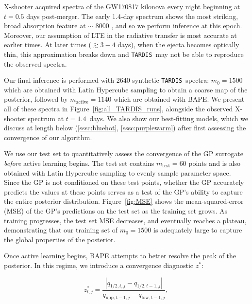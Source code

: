 \documentclass[twocolumn, twocolappendix]{aastex63}
\def\TARDIS{\texttt{TARDIS}}
\begin{document}
X-shooter acquired spectra of the GW170817 kilonova every night beginning at $t=0.5$ days post-merger. The early 1.4-day spectrum shows the most striking, broad absorption feature at $\sim$ $8000$ \text{\AA}, and so we perform inference at this epoch. Moreover, our assumption of LTE in the radiative transfer is most accurate at earlier times. At later times ($\gtrsim 3 - 4$ days), when the ejecta becomes optically thin, this approximation breaks down and \TARDIS~may not be able to reproduce the observed spectra. 


Our final inference is performed with 2640 synthetic \TARDIS~spectra: $m_0 = 1500$ which are obtained with Latin Hypercube sampling to obtain a coarse map of the posterior, followed by $m_{\mathrm{active}} = 1140$ which are obtained with BAPE. We present all of these spectra in Figure~\ref{fig:all_TARDIS_runs}, alongside the observed X-shooter spectrum at $t=1.4$~days. We also show our best-fitting models, which we discuss at length below (\ref{sssc:bluehot}, \ref{sssc:purplewarm}) after first assessing the convergence of our algorithm. 


We use our test set to quantitatively assess the convergence of the GP surrogate \textit{before} active learning begins. The test set contains $m_{\mathrm{test}} = 60$ points and is also obtained with Latin Hypercube sampling to evenly sample parameter space. Since the GP is not conditioned on these test points, whether the GP accurately predicts the values at these points serves as a test of the GP's ability to capture the entire posterior distribution. Figure~\ref{fig:MSE} shows the mean-squared-error (MSE) of the GP's predictions on the test set as the training set grows. As training progresses, the test set MSE decreases, and eventually reaches a plateau, demonstrating that our training set of $m_0 = 1500$ is adequately large to capture the global properties of the posterior. 


Once active learning begins, BAPE attempts to better resolve the peak of the posterior. In this regime, we introduce a convergence diagnostic $z^{*}$:

\begin{equation}
z^{*}_{t,j} = \frac{| q_{1/2,t,j} - q_{1/2,t-1,j} |}{ q_{\mathrm{upp},t-1,j} - q_{\mathrm{low},t-1,j}},
\end{equation}\label{eqn:convergence_z_modified}
\end{document}
